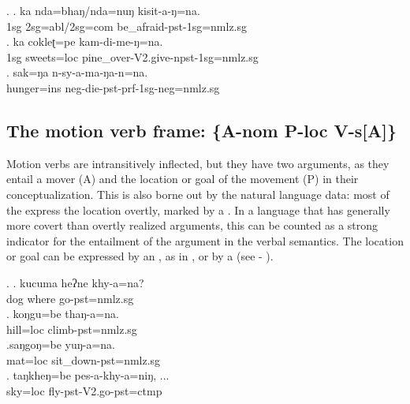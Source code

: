 \ex. \ag.  ka nda=bhaŋ/nda=nuŋ kisit-a-ŋ=na.\\
	{\sc 1sg} {\sc 2sg=abl/2sg=com} be\_afraid-{\sc pst-1sg=nmlz.sg}\\
\bg. ka cokleʈ=pe kam-di-me-ŋ=na.\\
	{\sc 1sg} sweets{\sc =loc} pine\_over-{\sc V2.give-npst-1sg=nmlz.sg}\\
\bg. sak=ŋa n-sy-a-ma-ŋa-n=na.\\
			hunger{\sc =ins} {\sc neg-}die{\sc -pst-prf-1sg-neg=nmlz.sg}\\
				
\subsection[The motion verb frame]{The motion verb frame: \{A-{\sc nom} P-{\sc loc} V-s[A]\}}\label{itr-motion}
 
\noindent 
Motion verbs are intransitively inflected, but they have two arguments, as they entail a mover (A) and the location or goal of the movement (P) in their conceptualization. This is also borne out by the natural language data: most of the  express the location overtly, marked by a . In a language that has generally more covert than overtly realized arguments, this can be counted as a strong indicator for the entailment of the  argument in the verbal semantics. The location or goal can be expressed by an , as in \Next[a], or by a  (see \Next[b] - \Next[d]). 

\ex. \ag. kucuma heʔne khy-a=na?\\
		dog where go{\sc [3sg]-pst=nmlz.sg} 	\\
	\bg. koŋgu=be thaŋ-a=na.\\
		hill{\sc =loc} climb{\sc [3sg]-pst=nmlz.sg}\\
	\bg.saŋgoŋ=be yuŋ-a=na.\\
	 mat{\sc =loc} sit\_down{\sc [3sg]-pst=nmlz.sg}\\
	\bg.  taŋkheŋ=be  pes-a-khy-a=niŋ, ...\\
	 sky{\sc =loc} fly{\sc [3sg]-pst-V2.go-pst=ctmp}		\\
	 	


